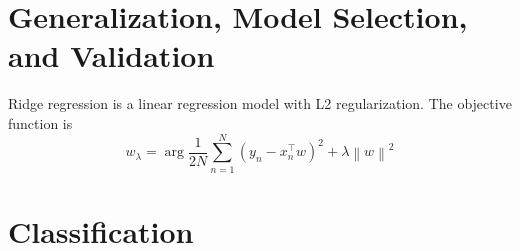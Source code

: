 \documentclass[10pt]{article}
\begin{document}
\section{Generalization, Model Selection, and Validation}
Ridge regression is a linear regression model with L2 regularization. The objective function is
$$
w_\lambda = \mathop{\arg\min_w}\frac{1}{2N}\sum_{n=1}^{N} (y_{n}-x_{n}^{\intercal}w)^{2}+\lambda\left\lVert w \right\rVert ^2
$$

\section{Classification} 
\end{document}
